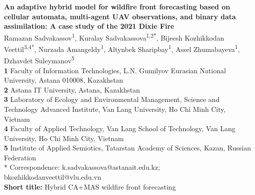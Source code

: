\documentclass[10pt,letterpaper]{article}
\begin{document}
\vspace*{0.2in}
\begin{flushleft}
{\Large
\textbf{An adaptive hybrid model for wildfire front forecasting based on cellular automata, multi-agent UAV observations, and binary data assimilation: A case study of the 2021 Dixie Fire}
}
\newline
\\
Ramazan Sadvakassov\textsuperscript{1},
Kuralay Sadvakassova\textsuperscript{1,2*},
Bijeesh Kozhikkodan Veettil\textsuperscript{3,4*},
Nurzada Amangeldy\textsuperscript{1},
Altynbek Sharipbay\textsuperscript{1},
Assel Zhumabayeva\textsuperscript{1},
Dzhavdet Suleymanov\textsuperscript{5}
\\
\bigskip
\textbf{1} Faculty of Information Technologies, L.N. Gumilyov Eurasian National University, Astana 010008, Kazakhstan
\\
\textbf{2} Astana IT University, Astana, Kazakhstan
\\
\textbf{3} Laboratory of Ecology and Environmental Management, Science and Technology Advanced Institute, Van Lang University, Ho Chi Minh City, Vietnam
\\
\textbf{4} Faculty of Applied Technology, Van Lang School of Technology, Van Lang University, Ho Chi Minh City, Vietnam
\\
\textbf{5} Institute of Applied Semiotics, Tatarstan Academy of Sciences, Kazan, Russian Federation
\\
\bigskip
* Correspondence: k.sadvakassova@astanait.edu.kz; bkozhikkodanveettil@vlu.edu.vn
\\
\textbf{Short title:} Hybrid CA+MAS wildfire front forecasting
\end{flushleft}
\end{document}
